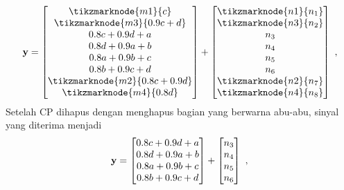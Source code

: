 \begin{equation}
\mathbf{y} = \begin{bmatrix}
\tikzmarknode{m1}{c}\\ 
\tikzmarknode{m3}{0.9c + d} \\ 
0.8c + 0.9d + a \\ 
0.8d + 0.9a + b\\ 
0.8a + 0.9b + c \\ 
0.8b + 0.9c + d\\ 
\tikzmarknode{m2}{0.8c + 0.9d}\\ 
\tikzmarknode{m4}{0.8d}
\end{bmatrix}
+ \begin{bmatrix}
\tikzmarknode{n1}{n_{1}}\\ 
\tikzmarknode{n3}{n_{2}}\\ 
n_{3}\\ 
n_{4}\\ 
n_{5}\\ 
n_{6}\\ 
\tikzmarknode{n2}{n_{7}}\\ 
\tikzmarknode{n4}{n_{8}}
\end{bmatrix}~,
\end{equation}  
Setelah CP dihapus dengan menghapus bagian yang berwarna abu-abu, sinyal yang diterima menjadi 
\begin{equation}
\mathbf{y} = \begin{bmatrix} 
0.8c + 0.9d + a \\ 
0.8d + 0.9a + b\\ 
0.8a + 0.9b + c \\ 
0.8b + 0.9c + d\\ 
\end{bmatrix}
+ \begin{bmatrix}
n_{3}\\ 
n_{4}\\ 
n_{5}\\ 
n_{6}\\ 
\end{bmatrix}~, \\ 
\end{equation}
